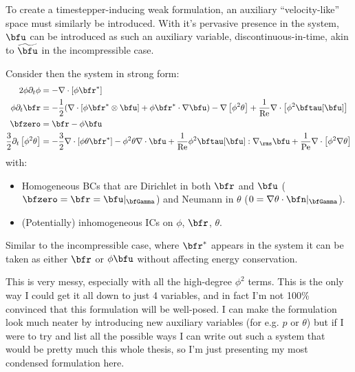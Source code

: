     To create a timestepper-inducing weak formulation, an auxiliary ``velocity-like'' space must similarly be introduced. With it's pervasive presence in the system, $\bfu$ can be introduced as such an auxiliary variable, discontinuous-in-time, akin to $\widetilde{\bfu}$ in the incompressible case.
    
    Consider then the system in strong form:
    \begin{align}
                                     2\phi\partial_{t}\phi  &=  - \nabla\cdot\left[\phi\bfr^{*}\right]   \\
           \phi\partial_{t}\bfr  &=  - \frac{1}{2}(\nabla\cdot\left[\phi\bfr^{*}\otimes\bfu\right] + \phi\bfr^{*}\cdot\nabla\bfu) - \nabla\left[\phi^{2}\theta\right] + \frac{1}{\rmRe}\nabla\cdot\left[\phi^{2}\bftau[\bfu]\right]  \\
                                                   \bfzero  &=  \bfr - \phi\bfu  \\
        \frac{3}{2}\partial_{t}\left[\phi^{2}\theta\right]  &=  - \frac{3}{2}\nabla\cdot\left[\phi\theta\bfr^{*}\right] - \phi^{2}\theta\nabla\cdot\bfu + \frac{1}{\rmRe}\phi^{2}\bftau[\bfu]:\nabla_{\rms}\bfu + \frac{1}{\rmPe}\nabla\cdot\left[\phi^{2}\nabla\theta\right]
    \end{align}
    with:
    \begin{itemize}
        \item  Homogeneous BCs that are Dirichlet in both $\bfr$ and $\bfu$ ($\bfzero  =  \bfr  =  \bfu|_{\bfGamma}$) and Neumann in $\theta$ ($0  =  \nabla\theta\cdot\bfn|_{\bfGamma}$).
        \item  (Potentially) inhomogeneous ICs on $\phi$, $\bfr$, $\theta$.
    \end{itemize}
    Similar to the incompressible case, where $\bfr^{*}$ appears in the system it can be taken as 
    either $\bfr$ or $\phi\bfu$ without affecting energy conservation.

    \begin{remark}
        This is very messy, especially with all the high-degree $\phi^{2}$ terms. This is the only way I could get it all down to just 4 variables, and in fact I'm not 100\% convinced that this formulation will be well-posed. I can make the formulation look much neater by introducing new auxiliary variables (for e.g. $p$ or $\theta$) but if I were to try and list all the possible ways I can write out such a system that would be pretty much this whole thesis, so I'm just presenting my most condensed formulation here. 
    \end{remark}

